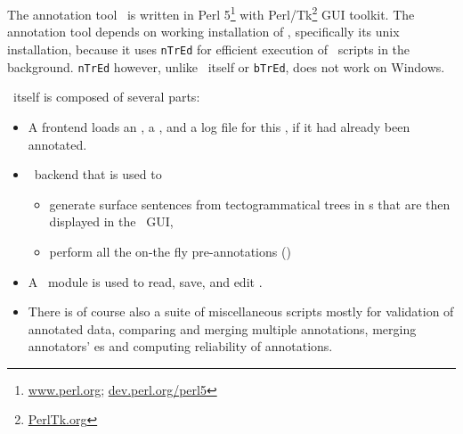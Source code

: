 
\section{\seman}
\label{sec:seman}
The annotation tool \seman\ is written in Perl 5\footnote{\url{www.perl.org}; \url{dev.perl.org/perl5}} with Perl/Tk\footnote{\url{PerlTk.org}} GUI toolkit. The annotation tool depends on working installation of \tred, specifically its unix installation, because it uses \texttt{nTrEd} for efficient execution of \tred\ scripts in the background. \texttt{nTrEd} however, unlike \tred\ itself or \texttt{bTrEd}, does not work on Windows.%

 \seman\ itself is composed of several parts:
\begin{itemize}
\item A frontend loads an \sf, a \semlex,  and a log file for this \sf, if it had already been annotated. 
\item \ntred\ backend that is used to 
	\begin{itemize}
	\item generate surface sentences from tectogrammatical trees in \tf{}s that are then displayed in the \seman\ GUI,
	\item perform all the on-the fly pre-annotations ()
	\end{itemize}
\item A \semlex\ module is used to read, save, and edit \semlex.
\item There is of course also a suite of miscellaneous scripts mostly for validation of annotated data, comparing and merging multiple annotations, merging annotators' \semlex{}es and computing reliability of annotations.
\end{itemize}

